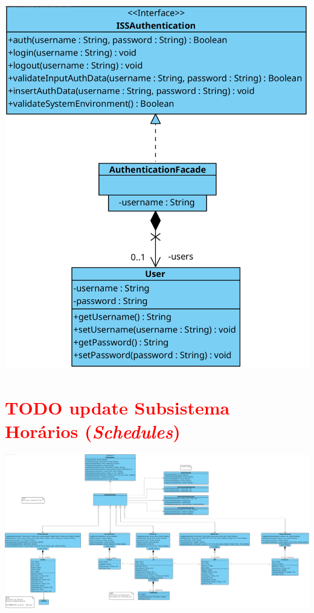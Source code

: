 \documentclass[a4paper,12pt]{scrreprt}
\begin{document}
\begin{minipage}{\textwidth}
    \centering
    \includegraphics[width=1\textwidth]{images/class-diagrams/2-authentication.png}
    \label{fig:5-2-subsistema_autenticacao}
\end{minipage}

\section{\textcolor{red}{TODO update Subsistema Horários (\textit{Schedules})}}

\begin{minipage}{\textwidth}
    \centering
    \includegraphics[width=1.5\textwidth, angle=270]{images/class-diagrams/3-schedules.png}
    \label{fig:5-3-subsistema_horarios}
\end{minipage}
\end{document}
